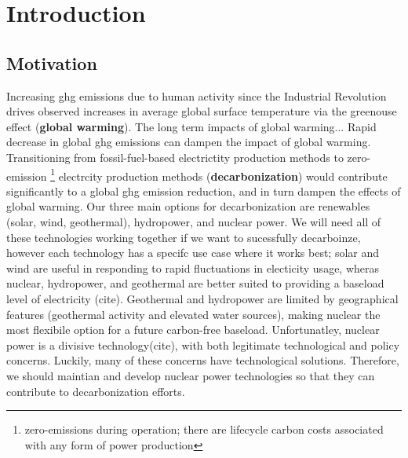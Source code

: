 \chapter{Introduction}%
\label{cha:introduction}

\section{Motivation}%
\label{sec:motivation}

Increasing \Gls{ghg} emissions due to human activity since the Industrial Revolution drives observed increases in average global surface temperature via the greenouse effect\cite{mitchell_greenhouse_1989} \cite{paola_a_arias_2021_ts} (\textbf{global warming}).
The long term impacts of global warming...
Rapid decrease in global \Gls{ghg} emissions can dampen the impact of global warming. Transitioning from fossil-fuel-based electrictity production methods to zero-emission \footnote{zero-emissions during operation; there are lifecycle carbon costs associated with any form of power production} electrcity production methods (\textbf{decarbonization}) would contribute significantly to a global \Gls{ghg} emission reduction, and in turn dampen the effects of global
warming. Our three main options for decarbonization are renewables (solar, wind, geothermal), hydropower, and nuclear power. We will need all of these technologies working together if we want to sucessfully decarboinze, however each technology has a specifc use case where it works best; solar and wind are useful in responding to rapid fluctuations in electicity usage, wheras nuclear, hydropower, and geothermal are better suited to
providing a baseload level of electricity (cite). Geothermal and hydropower are limited by geographical features (geothermal activity and elevated water sources), making nuclear the most flexibile option for a future carbon-free baseload. Unfortunatley, nuclear power is a divisive technology(cite), with both legitimate technological and policy concerns.%
Luckily, many of these concerns have technological solutions. Therefore, we should maintian and develop nuclear power technologies so that they can contribute to decarbonization efforts.

